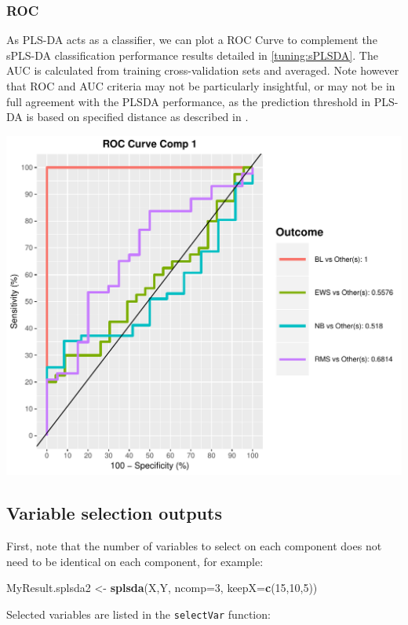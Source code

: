\documentclass[]{book}
\newenvironment{Shaded}{\begin{snugshade}}{\end{snugshade}}
\newcommand{\DataTypeTok}[1]{\textcolor[rgb]{0.13,0.29,0.53}{#1}}
\newcommand{\DecValTok}[1]{\textcolor[rgb]{0.00,0.00,0.81}{#1}}
\newcommand{\KeywordTok}[1]{\textcolor[rgb]{0.13,0.29,0.53}{\textbf{#1}}}
\newcommand{\NormalTok}[1]{#1}
\newcommand{\StringTok}[1]{\textcolor[rgb]{0.31,0.60,0.02}{#1}}
\begin{document}
\hypertarget{roc}{%
\subsubsection{ROC}\label{roc}}

As PLS-DA acts as a classifier, we can plot a ROC Curve to complement the sPLS-DA classification performance results detailed in \ref{tuning:sPLSDA}. The AUC is calculated from training cross-validation sets and averaged. Note however that ROC and AUC criteria may not be particularly insightful, or may not be in full agreement with the PLSDA performance, as the prediction threshold in PLS-DA is based on specified distance as described in \citep{mixomics}.

\begin{center}\includegraphics[width=0.5\linewidth]{Figures/04-auroc-1} \end{center}

\hypertarget{variable-selection-outputs}{%
\subsection{Variable selection outputs}\label{variable-selection-outputs}}

First, note that the number of variables to select on each component does not need to be identical on each component, for example:

\begin{Shaded}
\begin{Highlighting}[]
\NormalTok{MyResult.splsda2 <-}\StringTok{ }\KeywordTok{splsda}\NormalTok{(X,Y, }\DataTypeTok{ncomp=}\DecValTok{3}\NormalTok{, }\DataTypeTok{keepX=}\KeywordTok{c}\NormalTok{(}\DecValTok{15}\NormalTok{,}\DecValTok{10}\NormalTok{,}\DecValTok{5}\NormalTok{))}
\end{Highlighting}
\end{Shaded}

Selected variables are listed in the \texttt{selectVar} function:
\end{document}
